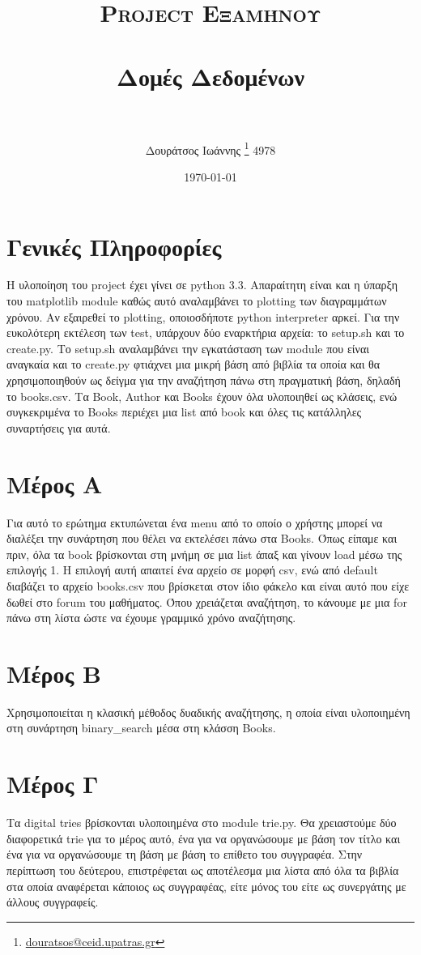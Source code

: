 \documentclass[a4paper]{article}
\title{	
\normalfont \normalsize 
\textsc{Project Εξαμήνου} \\ [30pt] %
\horrule{0.5pt} \\[0.4cm] %
\huge Δομές Δεδομένων \\ %
\horrule{2pt} \\[0.5cm] %
\vspace*{4\baselineskip}
}
\author[]{Δουράτσος Ιωάννης  \thanks{\href{mailto:douratsos@ceid.upatras.gr}{douratsos@ceid.upatras.gr}} 4978 }
\affil[]{Τμήμα Μηχανικών Η/Υ και Πληροφορικής, Πανεπιστήμιο Πατρών}
\date{\normalsize\today} %
\begin{document}
\newpage
\maketitle %
\newpage
\tableofcontents
\vspace*{1\baselineskip}
\newpage
\section{Γενικές Πληροφορίες}
Η υλοποίηση του project έχει γίνει σε python 3.3. Απαραίτητη είναι και η ύπαρξη του matplotlib module καθώς αυτό αναλαμβάνει το plotting των διαγραμμάτων χρόνου.
Αν εξαιρεθεί το plotting, οποιοσδήποτε python interpreter αρκεί.
Για την ευκολότερη εκτέλεση των test, υπάρχουν δύο εναρκτήρια αρχεία: το setup.sh και το create.py. Το setup.sh αναλαμβάνει την εγκατάσταση των module που είναι αναγκαία και το create.py φτιάχνει μια μικρή βάση από βιβλία τα οποία και θα χρησιμοποιηθούν ως δείγμα για την αναζήτηση πάνω στη πραγματική βάση, δηλαδή το books.csv.
Τα Book, Author και Books έχουν όλα υλοποιηθεί ως κλάσεις, ενώ συγκεκριμένα το Books περιέχει μια list από book και όλες τις κατάλληλες συναρτήσεις για αυτά.


\section{Μέρος Α}
Για αυτό το ερώτημα εκτυπώνεται ένα menu από το οποίο ο χρήστης μπορεί να διαλέξει την συνάρτηση που θέλει να εκτελέσει πάνω στα Books. Όπως είπαμε και πριν, όλα τα book βρίσκονται στη μνήμη σε μια list άπαξ και γίνουν load μέσω της επιλογής 1. 
Η επιλογή αυτή απαιτεί ένα αρχείο σε μορφή csv, ενώ από default διαβάζει το αρχείο books.csv που βρίσκεται στον ίδιο φάκελο και είναι αυτό που είχε δωθεί στο forum του μαθήματος. Όπου χρειάζεται αναζήτηση, το κάνουμε με μια for πάνω στη λίστα ώστε να έχουμε γραμμικό χρόνο αναζήτησης.

\section{Μέρος Β}
Χρησιμοποιείται η κλασική μέθοδος δυαδικής αναζήτησης, η οποία είναι υλοποιημένη στη συνάρτηση binary_search μέσα στη κλάσση Books.

\section{Μέρος Γ}
Τα digital tries βρίσκονται υλοποιημένα στο module trie.py. Θα χρειαστούμε δύο διαφορετικά trie για το μέρος αυτό, ένα για να οργανώσουμε με βάση τον τίτλο και ένα για να οργανώσουμε τη βάση με βάση το επίθετο του συγγραφέα. Στην περίπτωση του δεύτερου, επιστρέφεται ως αποτέλεσμα μια λίστα από όλα τα βιβλία στα οποία αναφέρεται κάποιος ως συγγραφέας, είτε μόνος του είτε ως συνεργάτης με άλλους συγγραφείς.
\end{document}
